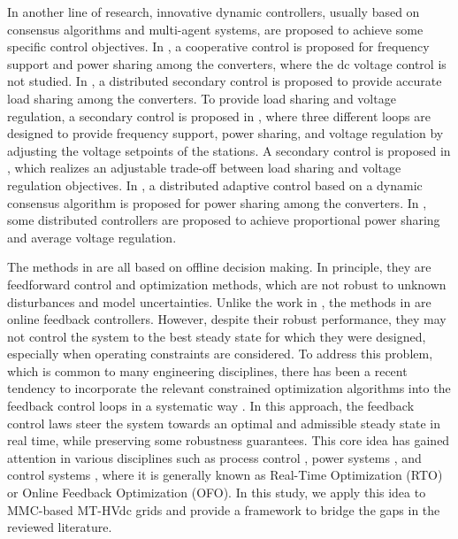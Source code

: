 In another line of research, innovative dynamic controllers, usually based on consensus algorithms and multi-agent systems, are proposed to achieve some specific control objectives.
In \cite{Wang2021}, a cooperative control is proposed for frequency support and power sharing among the converters, where the dc voltage control is not studied.
In \cite{Aram2018}, a distributed secondary control is proposed to provide accurate load sharing among the converters.
To provide load sharing and voltage regulation, a secondary control is proposed in \cite{Aram2023}, where three different loops are designed to provide frequency support, power sharing, and voltage regulation by adjusting the voltage setpoints of the stations. 
A secondary control is proposed in \cite{Wang2020}, which realizes an adjustable trade-off between load sharing and voltage regulation objectives.
In \cite{Lotfifard2022}, a distributed adaptive control based on a dynamic consensus algorithm is proposed for power sharing among the converters.
In \cite{Zhang2020, Yang2022}, some distributed controllers are proposed to achieve proportional power sharing and average voltage regulation.

The methods in \cite{Gavriluta2015,Papangelis2017,CarmonSanchez2020,Eriksson2018,Yogarathinam2019,Shinoda2022,Zhang2021,Zhang2022,Song2021,Xie2023, Li2018} are all based on offline decision making. In principle, they are feedforward control and optimization methods, which are not robust to unknown disturbances and model uncertainties.
Unlike the work in \cite{Gavriluta2015,Papangelis2017,CarmonSanchez2020,Eriksson2018,Yogarathinam2019,Shinoda2022,Zhang2021,Zhang2022,Song2021,Xie2023, Li2018}, the methods in \cite{Wang2021,Aram2018,Aram2023,Wang2020,Lotfifard2022,Zhang2020,Yang2022} are online feedback controllers.
However, despite their robust performance, they may not control the system to the best steady state for which they were designed, especially when operating constraints are considered.
To address this problem, which is common to many engineering disciplines, there has been a recent tendency to incorporate the relevant constrained optimization algorithms into the feedback control loops in a systematic way \cite{Krishnamoorthy2022,Emiliano2018,Ortman2020,Ortman2022,Häberle2021,Hauswirth2021}.
In this approach, the feedback control laws steer the system towards an optimal and admissible steady state in real time, while preserving some robustness guarantees.
This core idea has gained attention in various disciplines such as process control \cite{Krishnamoorthy2022}, power systems \cite{Emiliano2018,Ortman2020,Ortman2022}, and control systems \cite{Häberle2021,Hauswirth2021}, where it is generally known as Real-Time Optimization (RTO) or Online Feedback Optimization (OFO).
In this study, we apply this idea to MMC-based MT-HVdc grids and provide a framework to bridge the gaps in the reviewed literature.